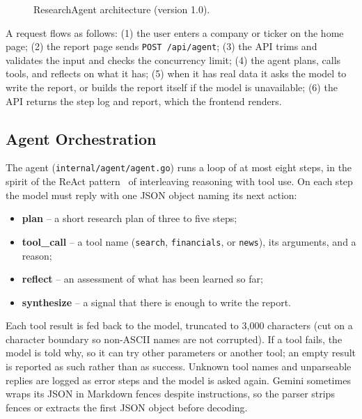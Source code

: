 \documentclass[12pt,a4paper,oneside]{report}
\begin{document}
\begin{figure}[H]
\caption{ResearchAgent architecture (version 1.0).}
\label{fig:architecture}
\end{figure}

A request flows as follows: (1) the user enters a company or ticker on the home page; (2) the report page sends \texttt{POST /api/agent}; (3) the API trims and validates the input and checks the concurrency limit; (4) the agent plans, calls tools, and reflects on what it has; (5) when it has real data it asks the model to write the report, or builds the report itself if the model is unavailable; (6) the API returns the step log and report, which the frontend renders.

\subsection{Agent Orchestration}
The agent (\texttt{internal/agent/agent.go}) runs a loop of at most eight steps, in the spirit of the ReAct pattern~\cite{react-agent} of interleaving reasoning with tool use. On each step the model must reply with one JSON object naming its next action:
\begin{itemize}[leftmargin=*]
\item \textbf{plan} -- a short research plan of three to five steps;
\item \textbf{tool\_call} -- a tool name (\texttt{search}, \texttt{financials}, or \texttt{news}), its arguments, and a reason;
\item \textbf{reflect} -- an assessment of what has been learned so far;
\item \textbf{synthesize} -- a signal that there is enough to write the report.
\end{itemize}
Each tool result is fed back to the model, truncated to 3{,}000 characters (cut on a character boundary so non-ASCII names are not corrupted). If a tool fails, the model is told why, so it can try other parameters or another tool; an empty result is reported as such rather than as success. Unknown tool names and unparseable replies are logged as error steps and the model is asked again. Gemini sometimes wraps its JSON in Markdown fences despite instructions, so the parser strips fences or extracts the first JSON object before decoding.
\end{document}
